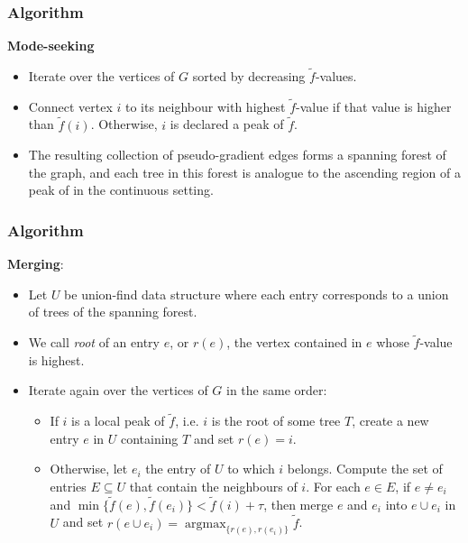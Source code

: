 \documentclass{beamer}
\theoremstyle{definition}
\DeclareMathOperator{\argmax}{argmax}
\begin{document}
\begin{frame}
\frametitle{Algorithm}
\textbf{Mode-seeking}

\begin{itemize}
\item<2-> Iterate over the vertices of $G$ sorted by decreasing $\tilde{f}$-values.
\item<3-> Connect vertex $i$ to its neighbour with highest $\tilde{f}$-value if that value is higher than $\tilde{f}(i)$. Otherwise, $i$ is declared a peak of $\tilde{f}$. %
\end{itemize}  
\begin{itemize}
\item<4->[] The resulting collection of
pseudo-gradient edges forms a spanning forest of the graph, and each tree in this
forest is analogue to the ascending region of a peak of in the continuous setting.
\end{itemize}
\end{frame}
\begin{frame}
\frametitle{Algorithm}
\textbf{Merging}:
\begin{itemize}
\item<2-> Let $U$ be union-find data structure where each entry corresponds to a union of trees of the spanning forest.
\item<3-> We call \emph{root} of an entry $e$, or $r(e)$, the vertex contained in $e$ whose $\tilde{f}$-value is highest.
\item<4-> Iterate again over the vertices of $G$ in the same order: 
\begin{itemize}
\item<5-> If $i$ is a local peak of $\tilde{f}$, i.e. $i$ is the root of some tree $T$, create a new entry $e$ in $U$ containing $T$ and set $r(e)=i$.%
\item<6-> Otherwise, let $e_i$ the entry of $U$ to which $i$ belongs. Compute the set of entries $E\subseteq U$ that contain the neighbours of $i$. For each $e\in E$, if $e\neq e_i$ and $\min\{\tilde{f}(e),\tilde{f}(e_i)\}<\tilde{f}(i)+\tau$, then merge $e$ and $e_i$ into $e\cup e_i$ in $U$ and set $r(e\cup e_i)=\argmax_{\{r(e),r(e_i)\}}\tilde{f}$. %
\end{itemize}
\end{itemize}
\end{frame}
\end{document}
